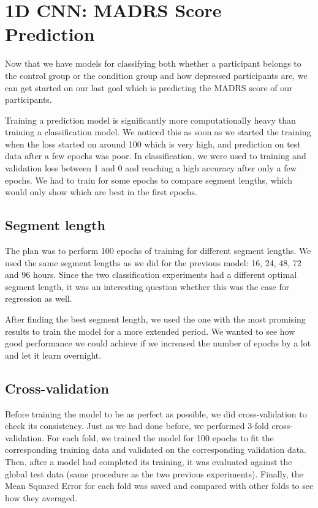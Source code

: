 \section{1D CNN: MADRS Score Prediction}
Now that we have models for classifying both whether a participant belongs to the control group or the condition group and how depressed participants are, we can get started on our last goal which is predicting the MADRS score of our participants. 

Training a prediction model is significantly more computationally heavy than training a classification model. We noticed this as soon as we started the training when the loss started on around 100 which is very high, and prediction on test data after a few epochs was poor. In classification, we were used to training and validation loss between 1 and 0 and reaching a high accuracy after only a few epochs. We had to train for some epochs to compare segment lengths, which would only show which are best in the first epochs.

\subsection{Segment length}
The plan was to perform 100 epochs of training for different segment lengths. We used the same segment lengths as we did for the previous model: 16, 24, 48, 72 and 96 hours. Since the two classification experiments had a different optimal segment length, it was an interesting question whether this was the case for regression as well. 

After finding the best segment length, we used the one with the most promising results to train the model for a more extended period. We wanted to see how good performance we could achieve if we increased the number of epochs by a lot and let it learn overnight. 

\subsection{Cross-validation}
Before training the model to be as perfect as possible, we did cross-validation to check its consistency. Just as we had done before, we performed 3-fold cross-validation. For each fold, we trained the model for 100 epochs to fit the corresponding training data and validated on the corresponding validation data. Then, after a model had completed its training, it was evaluated against the global test data (same procedure as the two previous experiments). Finally, the Mean Squared Error for each fold was saved and compared with other folds to see how they averaged. 

